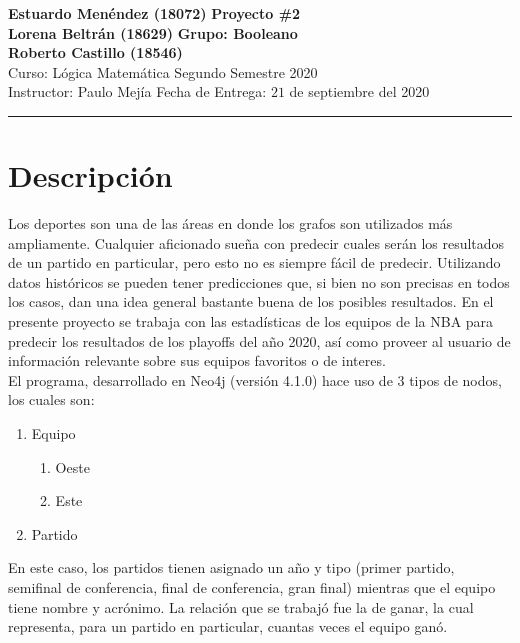 \documentclass[a4paper, 11pt]{article}
\begin{document}
\noindent
\large\textbf{Estuardo Menéndez \quad (18072) } \hfill \textbf{Proyecto \#2}   \\
\large\textbf{Lorena Beltrán \quad \qquad (18629)} \hfill \textbf{Grupo: Booleano} \\
\large\textbf{Roberto Castillo \quad \qquad(18546)} \\
\normalsize Curso: Lógica Matemática \hfill Segundo Semestre 2020\\
Instructor: Paulo Mejía \hfill Fecha de Entrega: $21$ de septiembre del 2020 \\
\noindent\rule{7in}{1pt}
\section*{Descripción}
Los deportes son una de las áreas en donde los grafos son utilizados más ampliamente. Cualquier aficionado sueña con predecir cuales serán los resultados de un partido en particular, pero esto no es siempre fácil de predecir. Utilizando datos históricos se pueden tener predicciones que, si bien no son precisas en todos los casos, dan una idea general bastante buena de los posibles resultados. En el presente proyecto se trabaja con las estadísticas de los equipos de la NBA para predecir los resultados de los playoffs del año 2020, así como proveer al usuario de información relevante sobre sus equipos favoritos o de interes. \\
El programa, desarrollado en Neo4j (versión 4.1.0) hace uso de 3 tipos de nodos, los cuales son: 
\begin{enumerate}
    \item Equipo
    \begin{enumerate}
        \item Oeste
        \item Este
    \end{enumerate}
    \item Partido
\end{enumerate}
En este caso, los partidos tienen asignado un año y tipo (primer partido, semifinal de conferencia, final de conferencia, gran final) mientras que el equipo tiene nombre y acrónimo. La relación que se trabajó fue la de ganar, la cual representa, para un partido en particular, cuantas veces el equipo ganó.
\end{document}
